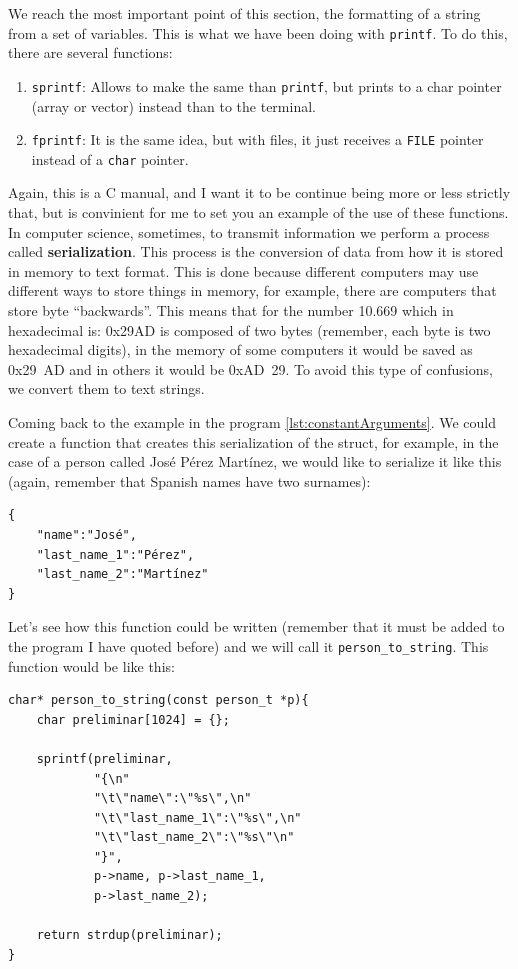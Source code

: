 \documentclass[a4paper]{article}
\begin{document}
We reach the most important point of this section, the formatting of a string
from a set of variables. This is what we have been doing with \verb!printf!.
To do this, there are several functions:
\begin{enumerate}
\item \verb!sprintf!: Allows to make the same than \verb!printf!, but prints to
a char pointer (array or vector) instead than to the terminal.
\item \verb!fprintf!: It is the same idea, but with files, it just receives a
\verb"FILE" pointer instead of a \verb"char" pointer.
\end{enumerate}

Again, this is a C manual, and I want it to be continue being more or less
strictly that, but is convinient for me to set you an example of the use of
these functions. In computer science, sometimes, to transmit information we
perform a process called \textbf{serialization}. This process is the conversion
of data from how it is stored in memory to text format. This is done because
different computers may use different ways to store things in memory, for
example, there are computers that store byte ``backwards''. This means that for
the number 10.669 which in hexadecimal is: 0x29AD is composed of two bytes
(remember, each byte is two hexadecimal digits), in the memory of some computers
it would be saved as 0x29~AD and in others it would be 0xAD~29. To avoid this
type of confusions, we convert them to text strings.

Coming back to the example in the program \ref{lst:constantArguments}. We could
create a function that creates this serialization of the struct, for example,
in the case of a person called José Pérez Martínez, we would like to serialize
it like this (again, remember that Spanish names have two surnames):
\begin{verbatim}
{
    "name":"José",
    "last_name_1":"Pérez",
    "last_name_2":"Martínez"
}
\end{verbatim}

Let's see how this function could be written (remember that it must be added to
the program I have quoted before) and we will call it \verb!person_to_string!.
This function would be like this:

\noindent
\begin{minipage}[H]{\linewidth}
\mbox{}
\begin{lstlisting}[style=C,
caption={Basic example of \texttt{sprintf}},
label={lst:sprintfExample}]
char* person_to_string(const person_t *p){
    char preliminar[1024] = {};

    sprintf(preliminar,
            "{\n"
            "\t\"name\":\"%s\",\n"
            "\t\"last_name_1\":\"%s\",\n"
            "\t\"last_name_2\":\"%s\"\n"
            "}",
            p->name, p->last_name_1,
            p->last_name_2);

    return strdup(preliminar);
}
\end{lstlisting}
\end{minipage}
\end{document}
